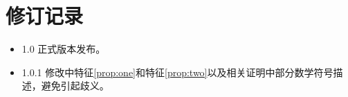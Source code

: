 \section{修订记录}
\begin{itemize}
\item{1.0} 正式版本发布。
\item{1.0.1} 修改中特征\ref{prop:one}和特征\ref{prop:two}以及相关证明中部分数学符号描述，避免引起歧义。
\end{itemize}
